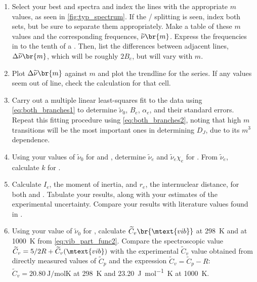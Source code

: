 \documentclass[nobib,nofonts,nols,nohyper]{tufte-handout}
\begin{document}
\begin{enumerate}
	\item Select your best  and  spectra and index the lines with the appropriate \( m \) values, as seen in \cref{fig:typ_spectrum}. 
	If the / splitting is seen, index both sets, but be sure to separate them appropriately.
	Make a table of these \( m \) values and the corresponding frequences, \( \widetilde{\nu}\br{m} \). 
	Express the frequencies in \si{\wn} to the tenth of a \si{\wn}. 
	Then, list the differences between adjacent lines, \( \Delta{\widetilde{\nu}}\br{m} \), which will be roughly \( 2 B_e \), but will vary with \( m \). 
	\item Plot \( \Delta{\widetilde{\nu}}\br{m} \) against \( m \) and plot the trendline for the series. 
	If any values seem out of line, check the calculation for that cell. 
	\item Carry out a multiple linear least-squares fit to the data using \cref{eq:both_branches1} to determine \( \widetilde{\nu}_0 \), \( B_e \), \( \alpha_e \), and their standard errors. 
	Repeat this fitting procedure using \cref{eq:both_branches2}, noting that high \( m \) transitions will be the most important ones in determining \( D_J \), due to its \( m^3 \) dependence. 
	\item Using your values of \( \widetilde{\nu}_0 \) for  and , determine \( \widetilde{\nu}_e \) and \( \widetilde{\nu}_e \chi_e \) for . From \( \widetilde{\nu}_e \), calculate \( k \) for . 
	\item Calculate \( I_e \), the moment of inertia, and \( r_e \), the internuclear distance, for both  and . 
	Tabulate your results, along with your estimates  of the experimental uncertainty. Compare your results with literature values found in \textcite{kerr82}. 
	\item Using your value of \( \widetilde{\nu}_0 \) for , calculate \( \widetilde{C}_v\br{\mtext{vib}} \) at \SI{298}{\K} and at \SI{1000}{\K} from \cref{eq:vib_part_func2}. 
	Compare the spectroscopic value \( \widetilde{C}_v = 5/2 R + \widetilde{C}_v(\mtext{vib}) \) with the experimental \( \widetilde{C}_v \) value obtained from directly measured values\autocite{lewis61,spencer48} of \( \widetilde{C}_p \) and the expression \( \widetilde{C}_v = \widetilde{C}_p - R \): \( \widetilde{C}_v = \SI{20.80}{\J \per \mole\K} \) at \SI{298}{K} and \SI{23.20}{\J \per \mol\K} at \SI{1000}{\K}. 
\end{enumerate}
\end{document}

